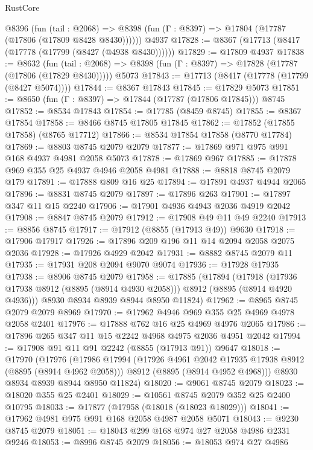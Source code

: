 \begin{lexlean}{RustCore}
\begin{coremodule}
    @8396
      (fun (tail : @2068) =>
      @8398 (fun (Γ : @8397) => @17804 (@17787 (@17806 (@17809 @8428 @8430))))))
    @4937
@17828 := @8367 (@17713 (@8417 (@17778 (@17799 (@8427 (@4938 @8430))))))
@17829 := @17809 @4937
@17838 := @8632
    (fun (tail : @2068) => @8398 (fun (Γ : @8397) => @17828 (@17787 (@17806 (@17829 @8430)))))
    @5073
@17843 := @17713 (@8417 (@17778 (@17799 (@8427 @5074))))
@17844 := @8367 @17843
@17845 := @17829 @5073
@17851 := @8650 (fun (Γ : @8397) => @17844 (@17787 (@17806 @17845))) @8745
@17852 := @8534 @17843
@17854 := @17785 (@8459 @8745)
@17855 := @8367 @17854
@17858 := @8466 @8745 @17805 @17845
@17862 := @17852 (@17855 @17858) (@8765 @17712)
@17866 := @8534 @17854 @17858 (@8770 @17784)
@17869 := @8803 @8745 @2079 @2079
@17877 := @17869 @971 @975 @991 @168 @4937 @4981 @2058 @5073
@17878 := @17869 @967
@17885 := @17878 @969 @355 @25 @4937 @4946 @2058 @4981
@17888 := @8818 @8745 @2079 @179
@17891 := @17888 @809 @16 @25
@17894 := @17891 @4937 @4944 @2065
@17896 := @8831 @8745 @2079
@17897 := @17896 @263
@17901 := @17897 @347 @11 @15 @2240
@17906 := @17901 @4936 @4943 @2036 @4919 @2042
@17908 := @8847 @8745 @2079
@17912 := @17908 @49 @11 @49 @2240
@17913 := @8856 @8745
@17917 := @17912 (@8855 (@17913 @49)) @9630
@17918 := @17906 @17917
@17926 := @17896 @209 @196 @11 @14 @2094 @2058 @2075 @2036
@17928 := @17926 @4929 @2042
@17931 := @8882 @8745 @2079 @11
@17935 := @17931 @208 @2094 @9070 @9074
@17936 := @17928 @17935
@17938 := @8906 @8745 @2079
@17958 := @17885
    (@17894
      (@17918 (@17936 @17938 @8912 (@8895 (@8914 @4930 @2058))) @8912 (@8895 (@8914 @4920 @4936)))
      @8930
      @8934
      @8939
      @8944
      @8950
      @11824)
@17962 := @8965 @8745 @2079 @2079 @8969
@17970 := @17962 @4946 @969 @355 @25 @4969 @4978 @2058 @2401
@17976 := @17888 @762 @16 @25 @4969 @4976 @2065
@17986 := @17896 @265 @347 @11 @15 @2242 @4968 @4975 @2036 @4951 @2042
@17994 := @17908 @91 @11 @91 @2242 (@8855 (@17913 @91)) @9647
@18018 := @17970
    (@17976
      (@17986
        @17994
        (@17926 @4961 @2042 @17935 @17938 @8912 (@8895 (@8914 @4962 @2058)))
        @8912
        (@8895 (@8914 @4952 @4968)))
      @8930
      @8934
      @8939
      @8944
      @8950
      @11824)
@18020 := @9061 @8745 @2079
@18023 := @18020 @355 @25 @2401
@18029 := @10561 @8745 @2079 @352 @25 @2400 @10795
@18033 := @17877 (@17958 (@18018 (@18023 @18029)))
@18041 := @17962 @4981 @975 @991 @168 @2058 @4987 @2058 @5071
@18043 := @9230 @8745 @2079
@18051 := @18043 @299 @168 @974 @27 @2058 @4986 @2331 @9246
@18053 := @8996 @8745 @2079
@18056 := @18053 @974 @27 @4986

\end{coremodule}
\end{lexlean}

